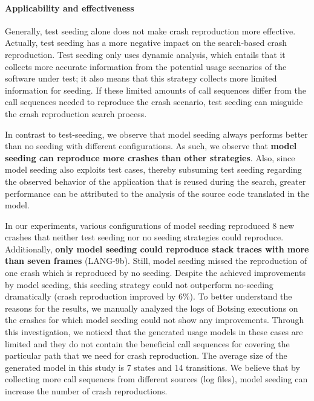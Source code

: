 

\paragraph{Applicability and effectiveness} Generally, test seeding alone does not make crash reproduction more effective. Actually, test seeding has a more negative impact on the search-based crash reproduction.
Test seeding only uses dynamic analysis, which entails that it collects more accurate information from the potential usage scenarios of the software under test; it also means that this strategy collects more limited information for seeding. If these limited amounts of call sequences differ from the call sequences needed to reproduce the crash scenario, test seeding can misguide the crash reproduction search process.

In contrast to test-seeding, we observe that model seeding always performs better than no seeding with different configurations. As such, we observe that \textbf{model seeding can reproduce more crashes than other strategies}. Also, since model seeding also exploits test cases, thereby subsuming test seeding regarding the observed behavior of the application that is reused during the search, greater performance can be attributed to the analysis of the source code translated in the model.

In our experiments, various configurations of model seeding reproduced 8 new crashes that neither test seeding nor no seeding strategies could reproduce. Additionally, \textbf{only model seeding could reproduce stack traces with more than seven frames} (\eg LA\-NG-9b). Still, model seeding missed the reproduction of one crash which is reproduced by no seeding.
Despite the achieved improvements by model seeding, this seeding strategy could not outperform no-seeding dramatically (crash reproduction improved by 6\%). To better understand the reasons for the results, we manually analyzed the logs of Botsing executions on the crashes for which model seeding could not show any improvements. Through this investigation, we noticed that the generated usage models in these cases are limited and they do not contain the beneficial call sequences for covering the particular path that we need for crash reproduction. The average size of the generated model in this study is 7 states and 14 transitions.
We believe that by collecting more call sequences from different sources (\ie log files), model seeding can increase the number of crash reproductions.

